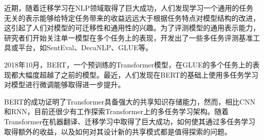 近期，随着迁移学习在NLP领域取得了巨大成功\cite{DBLP:conf/naacl/PetersNIGCLZ18}\cite{radford2018improving}\cite{devlin2018bert}，人们发现学习一个通用的任务无关的表示能够给特定任务带来的收益远远大于根据任务特点对模型结构的改进，这引起了人们对模型的可迁移性和通用性的兴趣。为了评测模型的通用表示能力，研究者们开始关注单一模型在多个任务上的表现，开发出了一些多任务评测基准工具或平台，如SentEval\cite{DBLP:conf/lrec/ConneauK18}、DecaNLP\cite{mccann2018natural}、GLUE\cite{DBLP:conf/emnlp/WangSMHLB18}等。

2018年10月，BERT\cite{devlin2018bert}，一个预训练的Transformer模型，在GLUE的多个任务上的表现都大幅度超越了之前的模型。最近，人们发现在BERT的基础上使用多任务学习对模型进行微调能够取得进一步提升\cite{liu2019multi}\cite{anonymous2018bam!}。

BERT的成功证明了Transformer具备强大的共享知识存储能力，然而，相比CNN和RNN，目前还很少有工作探索Transformer上的多任务学习架构。随着Transformer在机器翻译\cite{DBLP:conf/nips/VaswaniSPUJGKP17}、迁移学习\cite{radford2018improving}\cite{devlin2018bert}中取得了巨大成功，如何使其通过多任务学习取得额外的收益，以及如何对其设计新的共享模式都是值得探索的问题。